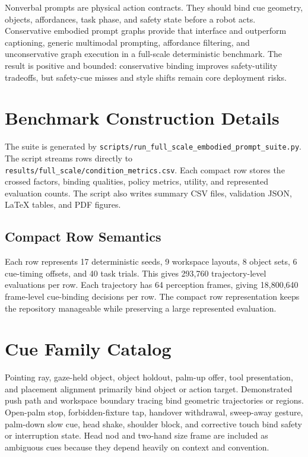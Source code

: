 \documentclass{article}
\begin{document}
Nonverbal prompts are physical action contracts. They should bind cue geometry, objects, affordances, task phase, and safety state before a robot acts. Conservative embodied prompt graphs provide that interface and outperform captioning, generic multimodal prompting, affordance filtering, and unconservative graph execution in a full-scale deterministic benchmark. The result is positive and bounded: conservative binding improves safety-utility tradeoffs, but safety-cue misses and style shifts remain core deployment risks.

\appendix
\renewcommand{\thesection}{\arabic{section}}

\section{Benchmark Construction Details}

The suite is generated by \texttt{scripts/run\_full\_scale\_embodied\_prompt\_suite.py}. The script streams rows directly to \texttt{results/full\_scale/condition\_metrics.csv}. Each compact row stores the crossed factors, binding qualities, policy metrics, utility, and represented evaluation counts. The script also writes summary CSV files, validation JSON, LaTeX tables, and PDF figures.

\subsection{Compact Row Semantics}

Each row represents 17 deterministic seeds, 9 workspace layouts, 8 object sets, 6 cue-timing offsets, and 40 task trials. This gives 293,760 trajectory-level evaluations per row. Each trajectory has 64 perception frames, giving 18,800,640 frame-level cue-binding decisions per row. The compact row representation keeps the repository manageable while preserving a large represented evaluation.

\section{Cue Family Catalog}

Pointing ray, gaze-held object, object holdout, palm-up offer, tool presentation, and placement alignment primarily bind object or action target. Demonstrated push path and workspace boundary tracing bind geometric trajectories or regions. Open-palm stop, forbidden-fixture tap, handover withdrawal, sweep-away gesture, palm-down slow cue, head shake, shoulder block, and corrective touch bind safety or interruption state. Head nod and two-hand size frame are included as ambiguous cues because they depend heavily on context and convention.
\end{document}
